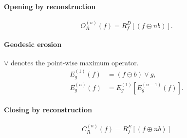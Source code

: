 \paragraph{Opening by reconstruction}
\[
	O_R^{(n)} (f) = R_f^D \left[ (f \ominus nb) \right].
\]

\paragraph{Geodesic erosion}
$\vee$ denotes the point-wise maximum operator.
\begin{align*}
	E_g^{(1)}(f) &= (f\ominus b)\vee g, \\
	E_g^{(n)}(f) &= E_g^{(1)}[E_g^{(n-1)}(f)].
\end{align*}

\paragraph{Closing by reconstruction}
\[
	C_R^{(n)} (f) = R_f^E \left[ (f \oplus nb) \right]
\]

